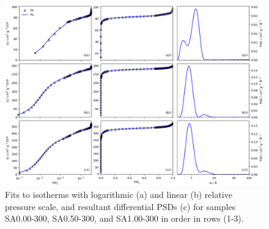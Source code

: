 \begin{subappendices}
\begin{figure}[p]
    \centering
    \includegraphics[width=\columnwidth, keepaspectratio]{4-impregnation/figs/SAxxx-300_isopsd.png}
    \caption{Fits to  isotherms with logarithmic (a) and linear (b) relative pressure scale, and resultant differential PSDs (c) for samples SA0.00-300, SA0.50-300, and SA1.00-300 in order in rows (1-3).}
    \label{fig:SAxxx-300_isopsd}
\end{figure}


\end{subappendices}
